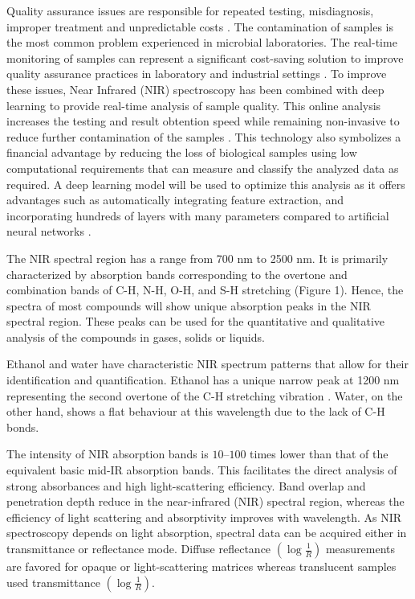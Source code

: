 \documentclass[12pt]{report}
\renewcommand{\cite}{\supercite}
\begin{document}
Quality assurance issues are responsible for repeated testing, misdiagnosis, improper treatment and unpredictable costs \cite{CostPoorQualityrandoxlaboratories}. The contamination of samples is the most common problem experienced in microbial laboratories. The real-time monitoring of samples can represent a significant cost-saving solution to improve quality assurance practices in laboratory and industrial settings \cite{ContaminationMicrobiologicalLaboratoryendeshawabatenh2018}. To improve these issues, Near Infrared (NIR) spectroscopy has been combined with deep learning to provide real-time analysis of sample quality. This online analysis increases the testing and result obtention speed while remaining non-invasive to reduce further contamination of the samples \cite{SpeechRecognitionUsingalsobhani2021}. This technology also symbolizes a financial advantage by reducing the loss of biological samples using low computational requirements that can measure and classify the analyzed data as required. A deep learning model will be used to optimize this analysis as it offers advantages such as automatically integrating feature extraction, and incorporating hundreds of layers with many parameters compared to artificial neural networks \cite{DeepLearningNearinfraredmishra2022}.

The NIR spectral region has a range from 700 nm to 2500 nm. It is primarily characterized by absorption bands corresponding to the overtone and combination bands of C-H, N-H, O-H, and S-H stretching (Figure 1). Hence, the spectra of most compounds will show unique absorption peaks in the NIR spectral region. These peaks can be used for the quantitative and qualitative analysis of the compounds in gases, solids or liquids.

Ethanol and water have characteristic NIR spectrum patterns that allow for their identification and quantification. Ethanol has a unique narrow peak at 1200 nm representing the second overtone of the C-H stretching vibration \cite{InfraredSpectroscopyNIR}. Water, on the other hand, shows a flat behaviour at this wavelength due to the lack of C-H bonds. 

The intensity of NIR absorption bands is $10 – 100$ times lower than that of the equivalent basic mid-IR absorption bands. This facilitates the direct analysis of strong absorbances and high light-scattering efficiency. Band overlap and penetration depth reduce in the near-infrared (NIR) spectral region, whereas the efficiency of light scattering and absorptivity improves with wavelength. As NIR spectroscopy depends on light absorption, spectral data can be acquired either in transmittance or reflectance mode. Diffuse reflectance $(\log \frac{1}{R} )$ measurements are favored for opaque or light-scattering matrices whereas translucent samples used transmittance $(\log \frac{1}{R})$.
\end{document}
